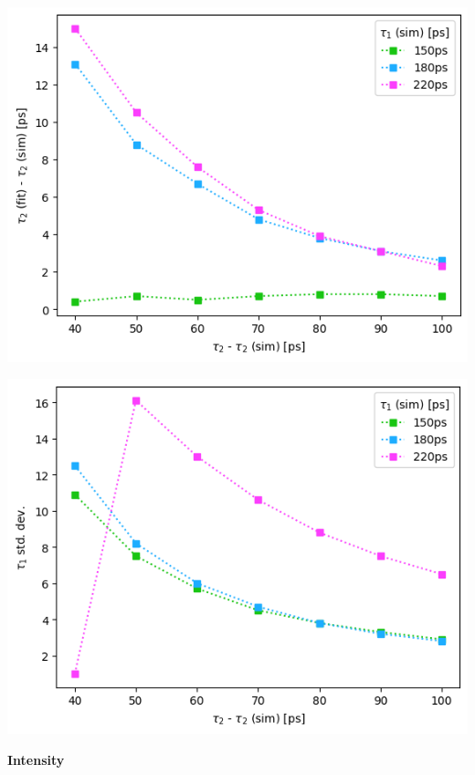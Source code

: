 {\begin{minipage}{.47\linewidth}
    \includegraphics[width=\linewidth]{Batch 3/regular IRF/t2-diff 8020.png}
    \label{fig:comp-t2-8020}
\end{minipage}
\hfill
\begin{minipage}{.47\linewidth}
    \includegraphics[width=\linewidth]{Batch 3/regular IRF/t2-err 8020.png}
    \label{fig:comp-t2err-8020}
\end{minipage}

\pagebreak
\textbf{Intensity}

}
